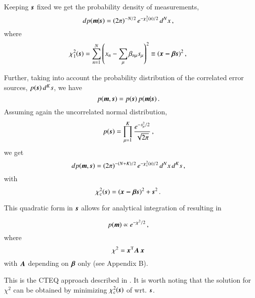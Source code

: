Keeping $\mb \rs$ fixed we get the probability density of measurements,
\begin{equation}
dp(\mb{m}| \mb s) =
 (2\pi)^{-N/2}\, e^{-\chi_1^2(\mbs\rs)/2}\, d^Nx
\,,
\end{equation}
where
\begin{equation}
\label{eq:chi1}
\chi_1^2(\mb\rs) = \sum_{n=1}^N
\left( x_n - \sum_\mu \beta_{n\mu} \rs_\mu \right)^2
\equiv (\mb{x - \beta s})^2
\,,
\end{equation}

Further, taking into account the probability distribution of the correlated error sources,
$p(\mb s)\, d^Ks$, we have
\begin{equation}
p(\mb{m},\mb s) = p(\mb s)\, p(\mb{m} | \mb s)
\,.
\end{equation}
Assuming again the uncorrelated normal distribution,
\begin{equation}
p(\mb s) = \prod_{\mu=1}^K \frac{e^{-s_\mu^2/2}}{\sqrt{2\pi}}
\,,
\end{equation}
we get
\begin{equation}
\label{eq:p_ms}
dp(\mb{m},\mb s) =
  (2\pi)^{-(N+K)/2}\, e^{-\chi_{\mathrm c}^2(\mbs\rs)/2}
  \,d^Nx\, d^Ks
\,,
\end{equation}
with
\begin{equation}
\label{eq:chi_c}
\chi_{\mathrm c}^2(\mb\rs) = 
(\mb{x - \beta s})^2 + \mb s^2
\,.
\end{equation}

This quadratic form in $\mb s$ allows for analytical integration of 
resulting in

\begin{equation}
p(\mb{m}) \propto e^{-\chi^2/2}
\,,
\end{equation}
where
\begin{equation}
\label{eq:chi_int}
\chi^2 = \mb x^{\mathrm{T}} \mb{A\,x}
\end{equation}
with $\mb A$ depending on $\mb\beta$ only
(see \eg \cite{Stump:2001gu} Appendix B).

This is \eg the CTEQ approach described in \cite{Stump:2001gu}.
It is worth noting that the solution  for $\chi^2$
can be obtained by minimizing $\chi_{\mathrm c}^2(\mb\rs)$ of  wrt. $\mb\rs$.

